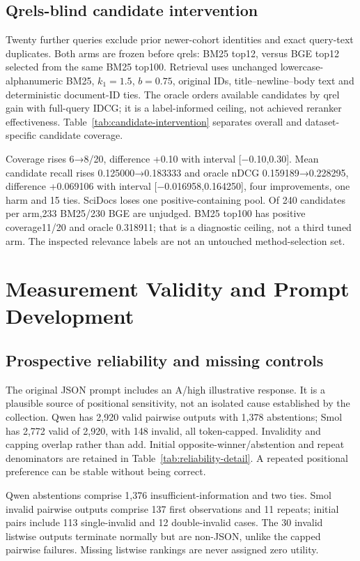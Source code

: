 \documentclass[pdflatex,sn-basic,Numbered]{sn-jnl}
\begin{document}
\subsection{Qrels-blind candidate intervention}
Twenty further queries exclude prior newer-cohort identities and exact query-text duplicates. Both arms are frozen before qrels: BM25 top12, versus BGE top12 selected from the same BM25 top100. Retrieval uses unchanged lowercase-alphanumeric BM25, $k_1=1.5$, $b=0.75$, original IDs, title--newline--body text and deterministic document-ID ties. The oracle orders available candidates by qrel gain with full-query IDCG; it is a label-informed ceiling, not achieved reranker effectiveness.
Table~\ref{tab:candidate-intervention} separates overall and dataset-specific candidate coverage.

Coverage rises 6→8/20, difference +0.10 with interval [−0.10,0.30]. Mean candidate recall rises 0.125000→0.183333 and oracle nDCG 0.159189→0.228295, difference +0.069106 with interval [−0.016958,0.164250], four improvements, one harm and 15 ties. SciDocs loses one positive-containing pool. Of 240 candidates per arm,233 BM25/230 BGE are unjudged. BM25 top100 has positive coverage11/20 and oracle 0.318911; that is a diagnostic ceiling, not a third tuned arm. The inspected relevance labels are not an untouched method-selection set.

\section{Measurement Validity and Prompt Development}\label{sec:si-validity}
\subsection{Prospective reliability and missing controls}
The original JSON prompt includes an A/high illustrative response. It is a plausible source of positional sensitivity, not an isolated cause established by the collection. Qwen has 2,920 valid pairwise outputs with 1,378 abstentions; Smol has 2,772 valid of 2,920, with 148 invalid, all token-capped. Invalidity and capping overlap rather than add. Initial opposite-winner/abstention and repeat denominators are retained in Table~\ref{tab:reliability-detail}. A repeated positional preference can be stable without being correct.

Qwen abstentions comprise 1,376 insufficient-information and two ties. Smol invalid pairwise outputs comprise 137 first observations and 11 repeats; initial pairs include 113 single-invalid and 12 double-invalid cases. The 30 invalid listwise outputs terminate normally but are non-JSON, unlike the capped pairwise failures. Missing listwise rankings are never assigned zero utility.
\end{document}
